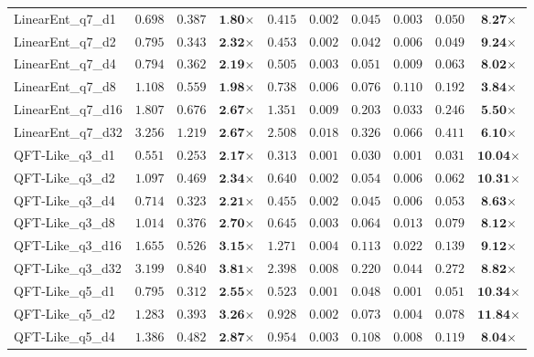 \begin{table*}[t]
{\begin{tabular}{| l || r r c || r r r r r c |}
LinearEnt\_q7\_d1 & $0.698$ & $0.387$ & $\textbf{1.80}$$\times$ & $0.415$ & $0.002$ & $0.045$ & $0.003$ & $0.050$ & $\textbf{8.27}$$\times$ \\
LinearEnt\_q7\_d2 & $0.795$ & $0.343$ & $\textbf{2.32}$$\times$ & $0.453$ & $0.002$ & $0.042$ & $0.006$ & $0.049$ & $\textbf{9.24}$$\times$ \\
LinearEnt\_q7\_d4 & $0.794$ & $0.362$ & $\textbf{2.19}$$\times$ & $0.505$ & $0.003$ & $0.051$ & $0.009$ & $0.063$ & $\textbf{8.02}$$\times$ \\
LinearEnt\_q7\_d8 & $1.108$ & $0.559$ & $\textbf{1.98}$$\times$ & $0.738$ & $0.006$ & $0.076$ & $0.110$ & $0.192$ & $\textbf{3.84}$$\times$ \\
LinearEnt\_q7\_d16 & $1.807$ & $0.676$ & $\textbf{2.67}$$\times$ & $1.351$ & $0.009$ & $0.203$ & $0.033$ & $0.246$ & $\textbf{5.50}$$\times$ \\
LinearEnt\_q7\_d32 & $3.256$ & $1.219$ & $\textbf{2.67}$$\times$ & $2.508$ & $0.018$ & $0.326$ & $0.066$ & $0.411$ & $\textbf{6.10}$$\times$ \\
QFT-Like\_q3\_d1 & $0.551$ & $0.253$ & $\textbf{2.17}$$\times$ & $0.313$ & $0.001$ & $0.030$ & $0.001$ & $0.031$ & $\textbf{10.04}$$\times$ \\
QFT-Like\_q3\_d2 & $1.097$ & $0.469$ & $\textbf{2.34}$$\times$ & $0.640$ & $0.002$ & $0.054$ & $0.006$ & $0.062$ & $\textbf{10.31}$$\times$ \\
QFT-Like\_q3\_d4 & $0.714$ & $0.323$ & $\textbf{2.21}$$\times$ & $0.455$ & $0.002$ & $0.045$ & $0.006$ & $0.053$ & $\textbf{8.63}$$\times$ \\
QFT-Like\_q3\_d8 & $1.014$ & $0.376$ & $\textbf{2.70}$$\times$ & $0.645$ & $0.003$ & $0.064$ & $0.013$ & $0.079$ & $\textbf{8.12}$$\times$ \\
QFT-Like\_q3\_d16 & $1.655$ & $0.526$ & $\textbf{3.15}$$\times$ & $1.271$ & $0.004$ & $0.113$ & $0.022$ & $0.139$ & $\textbf{9.12}$$\times$ \\
QFT-Like\_q3\_d32 & $3.199$ & $0.840$ & $\textbf{3.81}$$\times$ & $2.398$ & $0.008$ & $0.220$ & $0.044$ & $0.272$ & $\textbf{8.82}$$\times$ \\
QFT-Like\_q5\_d1 & $0.795$ & $0.312$ & $\textbf{2.55}$$\times$ & $0.523$ & $0.001$ & $0.048$ & $0.001$ & $0.051$ & $\textbf{10.34}$$\times$ \\
QFT-Like\_q5\_d2 & $1.283$ & $0.393$ & $\textbf{3.26}$$\times$ & $0.928$ & $0.002$ & $0.073$ & $0.004$ & $0.078$ & $\textbf{11.84}$$\times$ \\
QFT-Like\_q5\_d4 & $1.386$ & $0.482$ & $\textbf{2.87}$$\times$ & $0.954$ & $0.003$ & $0.108$ & $0.008$ & $0.119$ & $\textbf{8.04}$$\times$ \\

\end{tabular}}
\end{table*}
